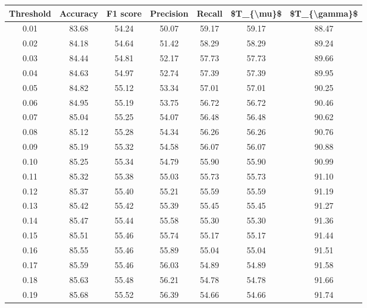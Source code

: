 \begin{tabular}{|c|c|c|c|c|c|c|}
\hline
 Threshold &  Accuracy &  F1 score &  Precision &  Recall &  \$T\_\{\textbackslash mu\}\$ &  \$T\_\{\textbackslash gamma\}\$ \\
\hline
      0.01 &     83.68 &     54.24 &      50.07 &   59.17 &      59.17 &         88.47 \\
      0.02 &     84.18 &     54.64 &      51.42 &   58.29 &      58.29 &         89.24 \\
      0.03 &     84.44 &     54.81 &      52.17 &   57.73 &      57.73 &         89.66 \\
      0.04 &     84.63 &     54.97 &      52.74 &   57.39 &      57.39 &         89.95 \\
      0.05 &     84.82 &     55.12 &      53.34 &   57.01 &      57.01 &         90.25 \\
      0.06 &     84.95 &     55.19 &      53.75 &   56.72 &      56.72 &         90.46 \\
      0.07 &     85.04 &     55.25 &      54.07 &   56.48 &      56.48 &         90.62 \\
      0.08 &     85.12 &     55.28 &      54.34 &   56.26 &      56.26 &         90.76 \\
      0.09 &     85.19 &     55.32 &      54.58 &   56.07 &      56.07 &         90.88 \\
      0.10 &     85.25 &     55.34 &      54.79 &   55.90 &      55.90 &         90.99 \\
      0.11 &     85.32 &     55.38 &      55.03 &   55.73 &      55.73 &         91.10 \\
      0.12 &     85.37 &     55.40 &      55.21 &   55.59 &      55.59 &         91.19 \\
      0.13 &     85.42 &     55.42 &      55.39 &   55.45 &      55.45 &         91.27 \\
      0.14 &     85.47 &     55.44 &      55.58 &   55.30 &      55.30 &         91.36 \\
      0.15 &     85.51 &     55.46 &      55.74 &   55.17 &      55.17 &         91.44 \\
      0.16 &     85.55 &     55.46 &      55.89 &   55.04 &      55.04 &         91.51 \\
      0.17 &     85.59 &     55.46 &      56.03 &   54.89 &      54.89 &         91.58 \\
      0.18 &     85.63 &     55.48 &      56.21 &   54.78 &      54.78 &         91.66 \\
      0.19 &     85.68 &     55.52 &      56.39 &   54.66 &      54.66 &         91.74 \\

\end{tabular}
